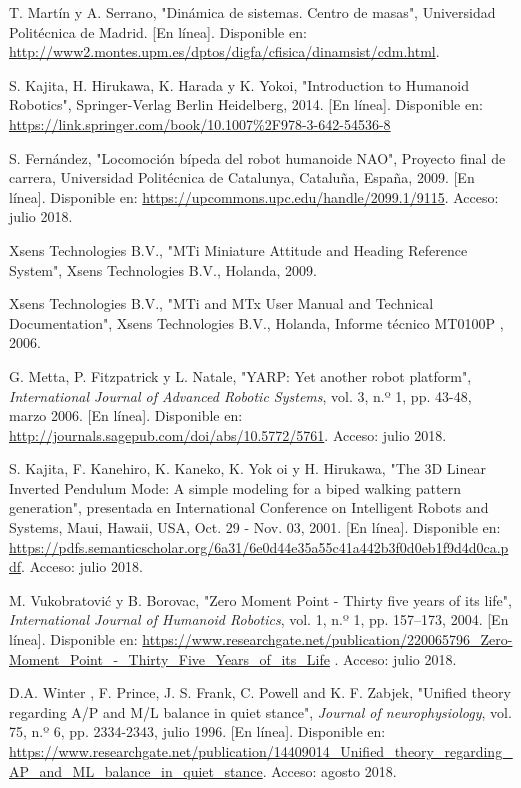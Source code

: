 \begin{thebibliography}{99}
 T. Martín y A. Serrano, "Dinámica de sistemas. Centro de masas", Universidad Politécnica de Madrid. [En línea]. Disponible en: \url{http://www2.montes.upm.es/dptos/digfa/cfisica/dinamsist/cdm.html}.

 S. Kajita, H. Hirukawa, K. Harada y K. Yokoi, "Introduction to Humanoid Robotics", Springer-Verlag Berlin Heidelberg, 2014. [En línea]. Disponible en: \url{https://link.springer.com/book/10.1007\%2F978-3-642-54536-8}

 S. Fernández, "Locomoción bípeda del robot humanoide NAO", Proyecto final de carrera, Universidad Politécnica de Catalunya, Cataluña, España, 2009. [En línea]. Disponible en: \url{https://upcommons.upc.edu/handle/2099.1/9115}. Acceso: julio 2018.

 Xsens Technologies B.V., "MTi Miniature Attitude and Heading Reference System", Xsens Technologies B.V., Holanda, 2009.

 Xsens Technologies B.V., "MTi and MTx User Manual and Technical Documentation", Xsens Technologies B.V., Holanda, Informe técnico MT0100P , 2006.

 G. Metta, P. Fitzpatrick y L. Natale, "YARP: Yet another robot platform", \textsl{International Journal of Advanced Robotic Systems}, vol. 3, n.º 1, pp. 43-48, marzo 2006. [En línea]. Disponible en: \url{http://journals.sagepub.com/doi/abs/10.5772/5761}. Acceso: julio 2018.

 S. Kajita, F. Kanehiro, K. Kaneko, K. Yok oi y H. Hirukawa, "The 3D Linear Inverted Pendulum Mode: A simple modeling for a biped walking pattern generation", presentada en International Conference on Intelligent Robots and Systems, Maui, Hawaii, USA, Oct. 29 - Nov. 03, 2001. [En línea]. Disponible en: \url{https://pdfs.semanticscholar.org/6a31/6e0d44e35a55c41a442b3f0d0eb1f9d4d0ca.pdf}. Acceso: julio 2018.

 M. Vukobratović y B. Borovac, "Zero Moment Point - Thirty five years of its life", \textit{International Journal of Humanoid Robotics}, vol. 1, n.º 1, pp. 157–173, 2004. [En línea]. Disponible en: \url{https://www.researchgate.net/publication/220065796_Zero-Moment_Point_-_Thirty_Five_Years_of_its_Life} . Acceso: julio 2018.

 D.A. Winter , F. Prince, J. S. Frank, C. Powell and K. F. Zabjek, "Unified theory regarding A/P and M/L balance in quiet stance", \textit{Journal of neurophysiology}, vol. 75, n.º 6, pp. 2334-2343, julio 1996. [En línea]. Disponible en: \url{https://www.researchgate.net/publication/14409014_Unified_theory_regarding_AP_and_ML_balance_in_quiet_stance}. Acceso: agosto 2018.


\end{thebibliography}
